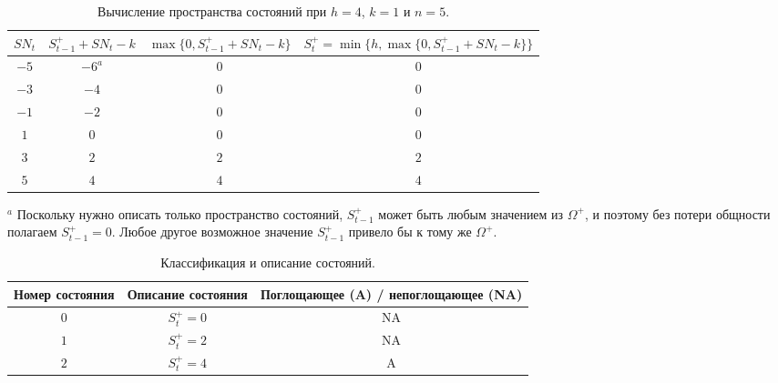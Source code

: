 \begin{table}[!ht]
	\centering
	\caption{Вычисление пространства состояний при \(h = 4\), \(k = 1\) и \(n = 5\).}
	\label{tab:4.10}
	\small
	\begin{tabular}{@{}cccc@{}}\toprule
		\(SN_t\) & \(S_{t-1}^+ + SN_t - k\) & \(\max\{0, S_{t-1}^+ + SN_t - k\}\) & \(S_t^+ = \min\{h, \max\{0, S_{t-1}^+ + SN_t - k\}\}\) \\ \midrule
		\(-5\) & \(-6^{a}\) & \(0\) & \(0\) \\
		\(-3\) & \(-4\) & \(0\) & \(0\) \\
		\(-1\) & \(-2\) & \(0\) & \(0\) \\
		\(1\) & \(0\) & \(0\) & \(0\) \\
		\(3\) & \(2\) & \(2\) & \(2\) \\
		\(5\) & \(4\) & \(4\) & \(4\) \\ \bottomrule
	\end{tabular}
	\par\smallskip
	\footnotesize \(^{a}\) Поскольку нужно описать только пространство состояний, \(S_{t-1}^+\) может быть любым значением из \(\Omega^+\), и поэтому без потери общности полагаем \(S_{t-1}^+ = 0\). Любое другое возможное значение \(S_{t-1}^+\) привело бы к тому же \(\Omega^+\).
\end{table}

\begin{table}[!ht]
	\centering
	\caption{Классификация и описание состояний.}
	\label{tab:4.11}
	\begin{tabular}{@{}ccc@{}}\toprule
		Номер состояния & Описание состояния & Поглощающее (A) / непоглощающее (NA) \\ \midrule
		\(0\) & \(S_t^+ = 0\) & NA \\
		\(1\) & \(S_t^+ = 2\) & NA \\
		\(2\) & \(S_t^+ = 4\) & A \\ \bottomrule
	\end{tabular}
\end{table}

